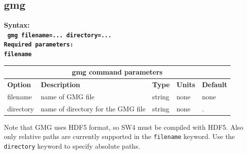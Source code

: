 \documentclass[11pt]{report}
\begin{document}
\subsection{gmg}
\label{keyword:gmg}
\begin{flushleft}\bf
Syntax:\\
\tt
gmg filename=... directory=...\\

\bf Required parameters:\\
\tt filename
\end{flushleft}
%
\begin{center}
\begin{tabular}{|l|p{8cm}|l|l||l|} \hline
\multicolumn{5}{|c|}{\bf gmg command parameters}\\ \hline
{\bf Option} & {\bf Description}                        & {\bf Type} & {\bf Units} & {\bf Default} \\ \hline 
\hline
filename      & name of GMG file                     & string  & none & none \\ \hline
directory     & name of directory for the GMG file   & string  & none & . \\ \hline
\end{tabular}
\end{center}
Note that GMG uses HDF5 format, so SW4 must be compiled with HDF5. Also only relative paths are currently supported in the \verb+filename+ keyword. Use the
\verb+directory+ keyword to specify absolute paths.



\end{document}
